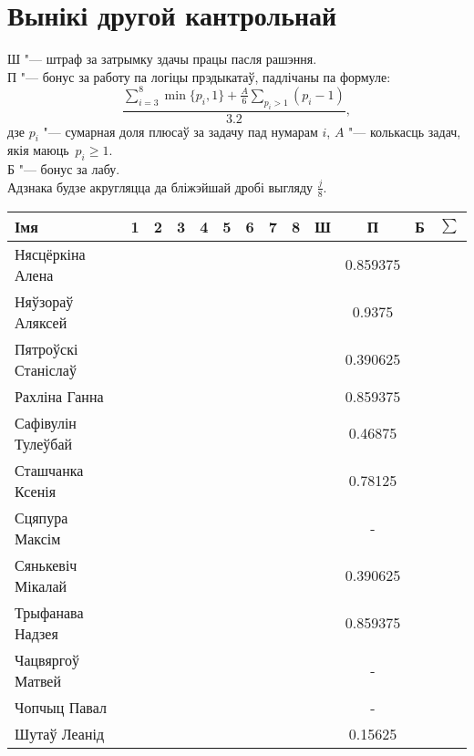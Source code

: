 


    \section{Вынікі другой кантрольнай}
    \noindent Ш "--- штраф за затрымку здачы працы пасля рашэння. \\
    П "--- бонус за работу па логіцы прэдыкатаў, падлічаны па формуле:
    $$\dfrac{\sum \limits _{i=3} ^8 \min\{p_i, 1\} + \frac{A}{6} \sum \limits _{p_i > 1} (p_i - 1)}{3.2},$$
    дзе $p_i$ "--- сумарная доля плюсаў за задачу пад нумарам $i$, $A$ "--- колькасць задач, якія маюць~$p_i \geqslant 1$. \\
    Б "--- бонус за лабу. \\
    Адзнака будзе акругляцца да бліжэйшай дробі выгляду $\frac{j}{8}$.
\begin{table}[H]
	\begin{tabular}{|l|c|c|c|c|c|c|c|c|c|c|c|c|}
		\hline
		Імя                 & 1 & 2   &  3   &  4   &  5   & 6 &  7  &  8   &  Ш   &   П   &  Б   & $\sum$ \\ \hline
		Нясцёркіна Алена    &  &    &     &     &     &  &    &     &     &   0.859375   &  &    \\ \hline
		Няўзораў Аляксей    &  &    &     &     &     &  &    &     &     &   0.9375   &     &       \\ \hline
		Пятроўскі Станіслаў &  &    &     &     &     &  &    &     &     &   0.390625   &     &       \\ \hline
		Рахліна Ганна       &  &    &     &     &     &  &  &     &     & 0.859375  &  &       \\ \hline
		Сафівулін Тулеўбай  &  &    &     &     &     &  &    &     &     &  0.46875    &     &       \\ \hline
		Сташчанка Ксенія    &  &  &  &     &     &  &    &     &     & 0.78125  &     &     \\ \hline
		Сцяпура Максім      &  &    &     &     &  &  &    &  &     & - &     &       \\ \hline
		Сянькевіч Мікалай   &  &    &     &     &     &  &    &     &     &   0.390625   &     &       \\ \hline
		Трыфанава Надзея    &  &    &     &   &     &  &    &   &     &  0.859375  &     &     \\ \hline
		Чацвяргоў Матвей    &  &    &     &     &     &  &    &     &  &    -  &     &    \\ \hline
		Чопчыц Павал        &  &    &     &     &     &  &    &     &     & - &     &       \\ \hline
		Шутаў Леанід        &  &    &     &  &     &  &    &     &     &  0.15625    &     &    \\ \hline
	\end{tabular}
\end{table}


